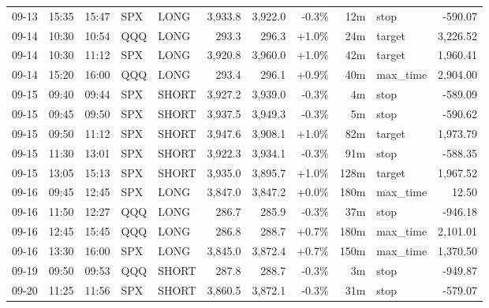 \documentclass[11pt,a4paper,twoside]{article}
\begin{document}
\begin{center}
\begin{longtable}{>{\color{txtmain}}l l l l l r r r r >{\color{txtmain}}l r}
09-13 & 15:35 & 15:47 & SPX & LONG & 3,933.8 & 3,922.0 & \textcolor{lossred}{-0.3\%} & 12m & stop & \textcolor{lossred}{-590.07} \\
09-14 & 10:30 & 10:54 & QQQ & LONG & 293.3 & 296.3 & \textcolor{wingreen}{+1.0\%} & 24m & target & \textcolor{wingreen}{3,226.52} \\
09-14 & 10:30 & 11:12 & SPX & LONG & 3,920.8 & 3,960.0 & \textcolor{wingreen}{+1.0\%} & 42m & target & \textcolor{wingreen}{1,960.41} \\
09-14 & 15:20 & 16:00 & QQQ & LONG & 293.4 & 296.1 & \textcolor{wingreen}{+0.9\%} & 40m & max\_time & \textcolor{wingreen}{2,904.00} \\
09-15 & 09:40 & 09:44 & SPX & SHORT & 3,927.2 & 3,939.0 & \textcolor{lossred}{-0.3\%} & 4m & stop & \textcolor{lossred}{-589.09} \\
09-15 & 09:45 & 09:50 & SPX & SHORT & 3,937.5 & 3,949.3 & \textcolor{lossred}{-0.3\%} & 5m & stop & \textcolor{lossred}{-590.62} \\
09-15 & 09:50 & 11:12 & SPX & SHORT & 3,947.6 & 3,908.1 & \textcolor{wingreen}{+1.0\%} & 82m & target & \textcolor{wingreen}{1,973.79} \\
09-15 & 11:30 & 13:01 & SPX & SHORT & 3,922.3 & 3,934.1 & \textcolor{lossred}{-0.3\%} & 91m & stop & \textcolor{lossred}{-588.35} \\
09-15 & 13:05 & 15:13 & SPX & SHORT & 3,935.0 & 3,895.7 & \textcolor{wingreen}{+1.0\%} & 128m & target & \textcolor{wingreen}{1,967.52} \\
09-16 & 09:45 & 12:45 & SPX & LONG & 3,847.0 & 3,847.2 & \textcolor{wingreen}{+0.0\%} & 180m & max\_time & \textcolor{wingreen}{12.50} \\
09-16 & 11:50 & 12:27 & QQQ & LONG & 286.7 & 285.9 & \textcolor{lossred}{-0.3\%} & 37m & stop & \textcolor{lossred}{-946.18} \\
09-16 & 12:45 & 15:45 & QQQ & LONG & 286.8 & 288.7 & \textcolor{wingreen}{+0.7\%} & 180m & max\_time & \textcolor{wingreen}{2,101.01} \\
09-16 & 13:30 & 16:00 & SPX & LONG & 3,845.0 & 3,872.4 & \textcolor{wingreen}{+0.7\%} & 150m & max\_time & \textcolor{wingreen}{1,370.50} \\
09-19 & 09:50 & 09:53 & QQQ & SHORT & 287.8 & 288.7 & \textcolor{lossred}{-0.3\%} & 3m & stop & \textcolor{lossred}{-949.87} \\
09-20 & 11:25 & 11:56 & SPX & SHORT & 3,860.5 & 3,872.1 & \textcolor{lossred}{-0.3\%} & 31m & stop & \textcolor{lossred}{-579.07} \\

\end{longtable}
\end{center}
\end{document}
